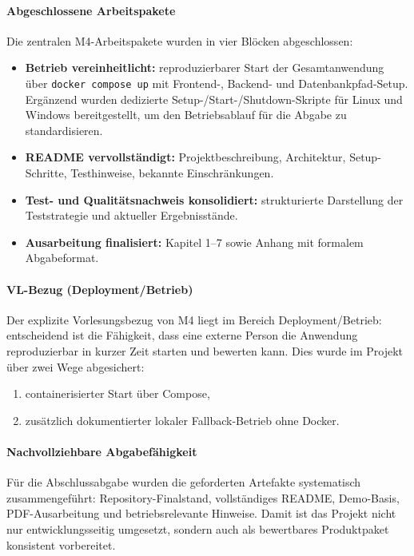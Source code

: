 \paragraph{Abgeschlossene Arbeitspakete}
Die zentralen M4-Arbeitspakete wurden in vier Blöcken abgeschlossen:
\begin{itemize}
  \item \textbf{Betrieb vereinheitlicht:} reproduzierbarer Start der Gesamtanwendung über
  \texttt{docker compose up} mit Frontend-, Backend- und Datenbankpfad-Setup.
  Ergänzend wurden dedizierte Setup-/Start-/Shutdown-Skripte für Linux und
  Windows bereitgestellt, um den Betriebsablauf für die Abgabe zu
  standardisieren.
  \item \textbf{README vervollständigt:} Projektbeschreibung, Architektur,
  Setup-Schritte, Testhinweise, bekannte Einschränkungen.
  \item \textbf{Test- und Qualitätsnachweis konsolidiert:} strukturierte
  Darstellung der Teststrategie und aktueller Ergebnisstände.
  \item \textbf{Ausarbeitung finalisiert:} Kapitel 1--7 sowie Anhang mit
  formalem Abgabeformat.
\end{itemize}

\paragraph{VL-Bezug (Deployment/Betrieb)}
Der explizite Vorlesungsbezug von M4 liegt im Bereich Deployment/Betrieb:
entscheidend ist die Fähigkeit, dass eine externe Person die Anwendung
reproduzierbar in kurzer Zeit starten und bewerten kann.
Dies wurde im Projekt über zwei Wege abgesichert:
\begin{enumerate}
  \item containerisierter Start über Compose,
  \item zusätzlich dokumentierter lokaler Fallback-Betrieb ohne Docker.
\end{enumerate}

\paragraph{Nachvollziehbare Abgabefähigkeit}
Für die Abschlussabgabe wurden die geforderten Artefakte systematisch
zusammengeführt:
Repository-Finalstand, vollständiges README, Demo-Basis, PDF-Ausarbeitung und
betriebsrelevante Hinweise.
Damit ist das Projekt nicht nur entwicklungsseitig umgesetzt, sondern auch als
bewertbares Produktpaket konsistent vorbereitet.

